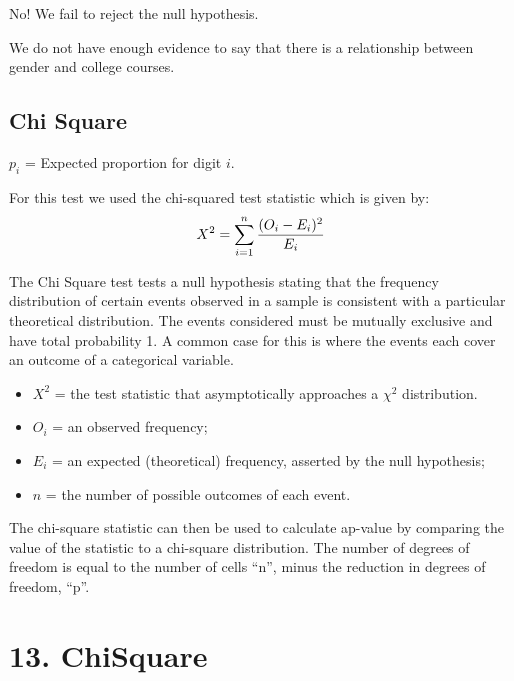 \documentclass[]{report}
\begin{document}
No! We fail to reject the null hypothesis.

We do not have enough evidence to say that there is a relationship between gender and college courses.










\section{Chi Square}


$p_{i}$ = Expected proportion for digit $i$.

For this test we used the chi-squared test statistic which is given by:
\begin{equation}
X^2 = \sum_{i=1}^{n} {(O_i - E_i)^2 \over E_i}
\end{equation}


The Chi Square test tests a null hypothesis stating that the frequency distribution of certain events observed in a sample is consistent with a particular theoretical distribution. The events considered must be mutually exclusive and have total probability 1. A common case for this is where the events each cover an outcome of a categorical variable.

\begin{itemize}
	\item $X^2$ = the test statistic that asymptotically approaches a $\chi^2$ distribution.
	\item $O_i$ = an observed frequency;
	\item $E_i$ = an expected (theoretical) frequency, asserted by the null hypothesis;
	\item $n $  = the number of possible outcomes of each event.
\end{itemize}

The chi-square statistic can then be used to calculate ap-value by comparing the value of the statistic to a chi-square distribution. The number of degrees of freedom is equal to the number of cells ``n'', minus the reduction in degrees of freedom, ``p''.




			
			\chapter{13. ChiSquare}
			
\end{document}
